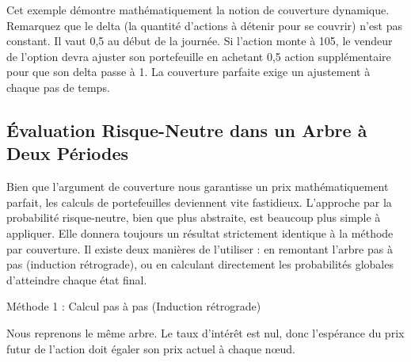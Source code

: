 \begin{enumerate}[label=Étape \arabic* :, leftmargin=*]
\end{enumerate}

Cet exemple démontre mathématiquement la notion de couverture dynamique. Remarquez que le delta (la quantité d'actions à détenir pour se couvrir) n'est pas constant. Il vaut 0,5 au début de la journée. Si l'action monte à 105, le vendeur de l'option devra ajuster son portefeuille en achetant 0,5 action supplémentaire pour que son delta passe à 1. La couverture parfaite exige un ajustement à chaque pas de temps.

\subsection{Évaluation Risque-Neutre dans un Arbre à Deux Périodes}

Bien que l'argument de couverture nous garantisse un prix mathématiquement parfait, les calculs de portefeuilles deviennent vite fastidieux. L'approche par la probabilité risque-neutre, bien que plus abstraite, est beaucoup plus simple à appliquer. Elle donnera toujours un résultat strictement identique à la méthode par couverture. Il existe deux manières de l'utiliser : en remontant l'arbre pas à pas (induction rétrograde), ou en calculant directement les probabilités globales d'atteindre chaque état final.

Méthode 1 : Calcul pas à pas (Induction rétrograde)

Nous reprenons le même arbre. Le taux d'intérêt est nul, donc l'espérance du prix futur de l'action doit égaler son prix actuel à chaque nœud.

